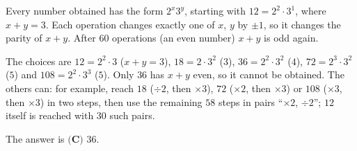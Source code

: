 Every number obtained has the form $2^x3^y$, starting with $12=2^2\cdot3^1$, where $x+y=3$. Each operation changes exactly one of $x$, $y$ by $\pm1$, so it changes the parity of $x+y$. After $60$ operations (an even number) $x+y$ is odd again.

The choices are $12=2^2\cdot3$ ($x+y=3$), $18=2\cdot3^2$ ($3$), $36=2^2\cdot3^2$ ($4$), $72=2^3\cdot3^2$ ($5$) and $108=2^2\cdot3^3$ ($5$). Only $36$ has $x+y$ even, so it cannot be obtained. The others can: for example, reach $18$ ($\div2$, then $\times3$), $72$ ($\times2$, then $\times3$) or $108$ ($\times3$, then $\times3$) in two steps, then use the remaining $58$ steps in pairs ``$\times2$, $\div2$''; $12$ itself is reached with $30$ such pairs.

The answer is $\boxed{\textbf{(C) }36}$.
